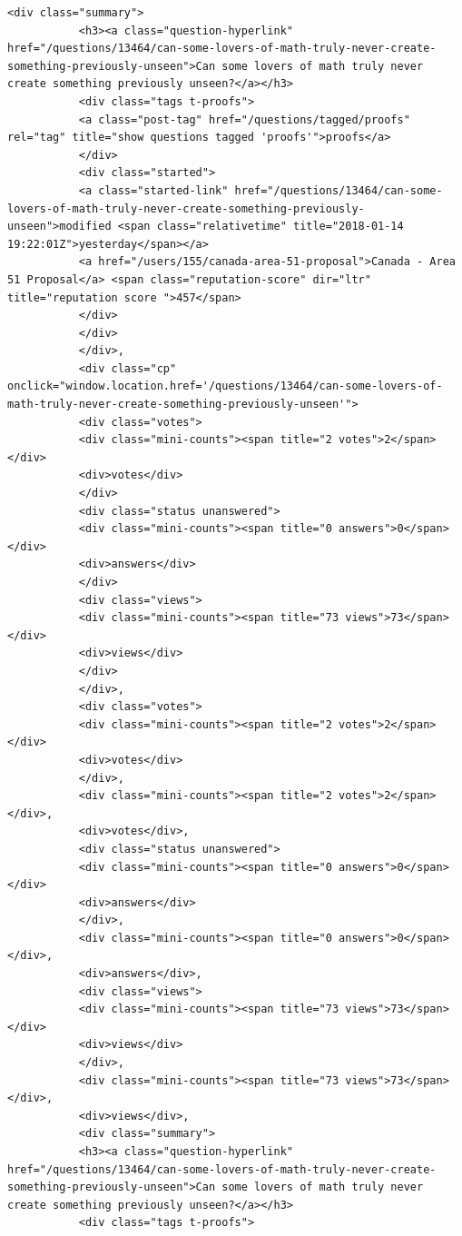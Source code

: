 \documentclass[11pt]{article}
\begin{document}
\begin{Verbatim}[commandchars=\\\{\}]
           <div class="summary">
           <h3><a class="question-hyperlink" href="/questions/13464/can-some-lovers-of-math-truly-never-create-something-previously-unseen">Can some lovers of math truly never create something previously unseen?</a></h3>
           <div class="tags t-proofs">
           <a class="post-tag" href="/questions/tagged/proofs" rel="tag" title="show questions tagged 'proofs'">proofs</a>
           </div>
           <div class="started">
           <a class="started-link" href="/questions/13464/can-some-lovers-of-math-truly-never-create-something-previously-unseen">modified <span class="relativetime" title="2018-01-14 19:22:01Z">yesterday</span></a>
           <a href="/users/155/canada-area-51-proposal">Canada - Area 51 Proposal</a> <span class="reputation-score" dir="ltr" title="reputation score ">457</span>
           </div>
           </div>
           </div>,
           <div class="cp" onclick="window.location.href='/questions/13464/can-some-lovers-of-math-truly-never-create-something-previously-unseen'">
           <div class="votes">
           <div class="mini-counts"><span title="2 votes">2</span></div>
           <div>votes</div>
           </div>
           <div class="status unanswered">
           <div class="mini-counts"><span title="0 answers">0</span></div>
           <div>answers</div>
           </div>
           <div class="views">
           <div class="mini-counts"><span title="73 views">73</span></div>
           <div>views</div>
           </div>
           </div>,
           <div class="votes">
           <div class="mini-counts"><span title="2 votes">2</span></div>
           <div>votes</div>
           </div>,
           <div class="mini-counts"><span title="2 votes">2</span></div>,
           <div>votes</div>,
           <div class="status unanswered">
           <div class="mini-counts"><span title="0 answers">0</span></div>
           <div>answers</div>
           </div>,
           <div class="mini-counts"><span title="0 answers">0</span></div>,
           <div>answers</div>,
           <div class="views">
           <div class="mini-counts"><span title="73 views">73</span></div>
           <div>views</div>
           </div>,
           <div class="mini-counts"><span title="73 views">73</span></div>,
           <div>views</div>,
           <div class="summary">
           <h3><a class="question-hyperlink" href="/questions/13464/can-some-lovers-of-math-truly-never-create-something-previously-unseen">Can some lovers of math truly never create something previously unseen?</a></h3>
           <div class="tags t-proofs">

\end{Verbatim}
\end{document}
